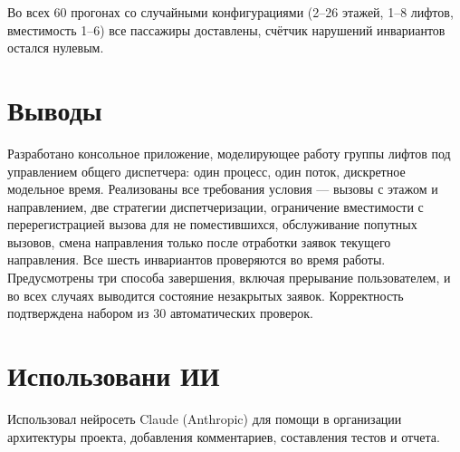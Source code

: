 \documentclass[12pt,a4paper]{article}
\begin{document}
Во всех 60 прогонах со случайными конфигурациями (2--26 этажей, 1--8
лифтов, вместимость 1--6) все пассажиры доставлены, счётчик нарушений
инвариантов остался нулевым.

\section{Выводы}

Разработано консольное приложение, моделирующее работу группы лифтов под
управлением общего диспетчера: один процесс, один поток, дискретное
модельное время. Реализованы все требования условия --- вызовы с этажом и
направлением, две стратегии диспетчеризации, ограничение вместимости с
перерегистрацией вызова для не поместившихся, обслуживание попутных
вызовов, смена направления только после отработки заявок текущего
направления. Все шесть инвариантов проверяются во время работы.
Предусмотрены три способа завершения, включая прерывание пользователем, и
во всех случаях выводится состояние незакрытых заявок. Корректность
подтверждена набором из 30 автоматических проверок.

\section{Использовани ИИ}

Использовал нейросеть Claude (Anthropic) для помощи в организации архитектуры проекта, добавления комментариев, составления тестов и отчета.
\end{document}
